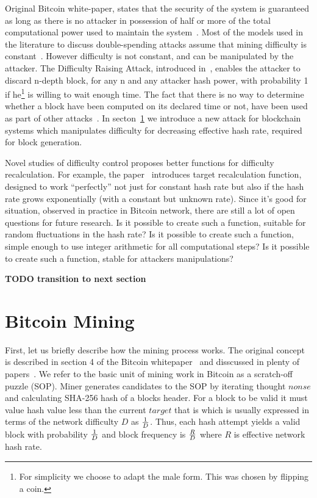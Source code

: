 \documentclass[number,preprint,review]{elsarticle}
\begin{document}
Original Bitcoin white-paper, states that the security of the system is guaranteed as long as there is no attacker in possession of half or more of the total computational power used to maintain the system~\cite{Nakamoto2008}.
Most of the models used in the literature to discuss double-spending attacks assume that mining difficulty is constant~\cite{??}.
However difficulty is not constant, and can be manipulated by the attacker.
The Difficulty Raising Attack, introduced in~\cite{bahack2013theoretical}, enables the attacker to discard n-depth block, for any n and any attacker hash power, with probability 1 if he\footnote{For simplicity we choose to adapt the male form. This was chosen by flipping a coin.} is willing to wait enough time.
The fact that there is no way to determine whether a block have been computed on its declared time or not, have been used as part of other attacks~\cite{timejacking2011, artforz2011}.
In secton~\ref{sec:bit} we introduce a new attack for blockchain systems which manipulates difficulty for decreasing effective hash rate, required for block generation.

Novel studies of difficulty control proposes better functions for difficulty recalculation.
For example, the paper~\cite{kraft2015difficulty} introduces target recalculation function, designed to work “perfectly” not just for constant hash rate but also if the hash rate grows exponentially (with a constant but unknown rate).
Since it's good for situation, observed in practice in Bitcoin network, there are still a lot of open questions for future research.
Is it possible to create such a function, suitable for random fluctuations in the hash rate?
Is it possible to create such a function, simple enough to use integer arithmetic for all computational steps?
Is it possible to create such a function, stable for attackers manipulations?

\textbf{TODO transition to next section}

\section{Bitcoin Mining}
\label{sec:bit}

First, let us briefly describe how the mining process works.
The original concept is described in section 4 of the Bitcoin whitepaper~\cite{Nakamoto2008} and disscussed in plenty of papers~\cite{kraft2015difficulty, miller2014permacoin, eyal2014majority}.
We refer to the basic unit of mining work in Bitcoin as a scratch-off puzzle (SOP).
Miner generates candidates to the SOP by iterating thought \(nonse\) and calculating SHA-256 hash of a blocks header.
For a block to be valid it must value hash value less than the current \(target\) that is which is usually expressed in terms of the network difficulty \(D\) as \(1\over D\).
Thus, each hash attempt yields a valid block with probability \(1\over D\) and block frequency is \(R\over D\) where \(R\) is effective network hash rate.
\end{document}
